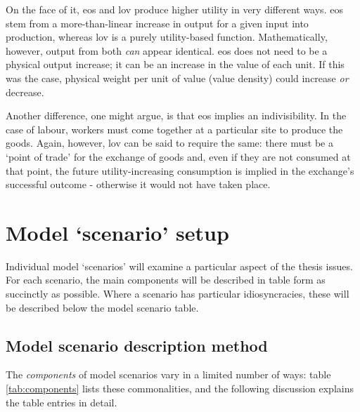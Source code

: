 
On the face of it, \gls{eos} and \gls{lov} produce higher utility in very different ways. \Gls{eos} stem from a more-than-linear increase in output for a given input into production, whereas \gls{lov} is a purely utility-based function. Mathematically, however, output from both \emph{can} appear identical. \Gls{eos} does not need to be a physical output increase; it can be an increase in the value of each unit. If this was the case, physical weight per unit of value (value density) could increase \emph{or} decrease.

Another difference, one might argue, is that \gls{eos} implies an indivisibility. In the case of labour, workers must come together at a particular site to produce the goods. Again, however, \gls{lov} can be said to require the same: there must be a `point of trade' for the exchange of goods and, even if they are not consumed at that point, the future utility-increasing consumption is implied in the exchange's successful outcome - otherwise it would not have taken place.

\section{Model `scenario' setup \label{sec:scenarioFramework}}

Individual model `scenarios' will examine a particular aspect of the thesis issues. For each scenario, the main components will be described in table form as succinctly as possible. Where a scenario has particular idiosyncracies, these will be described below the model scenario table. 

\subsection{Model scenario description method}

The \emph{components} of model scenarios vary in a limited number of ways: table \ref{tab:components} lists these commonalities, and the following discussion explains the table entries in detail. 



